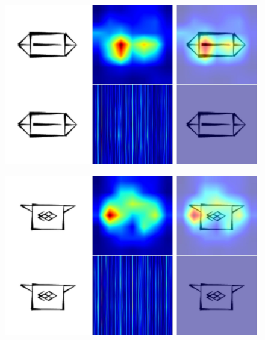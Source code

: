 \documentclass[11pt,a4paper,oneside]{report}
\begin{document}
 \begin{figure}[H]
    \centering
    \includegraphics[width=0.9\linewidth]{Visualizations/Grad-CAM/Proto-Elamite/gradcam_M304-A_combined.pdf}
\end{figure}
 \begin{figure}[H]
    \centering
    \includegraphics[width=0.9\linewidth]{Visualizations/Grad-CAM/Proto-Elamite/gradcam_M317+M265-B_combined.pdf}
\end{figure}
\end{document}
